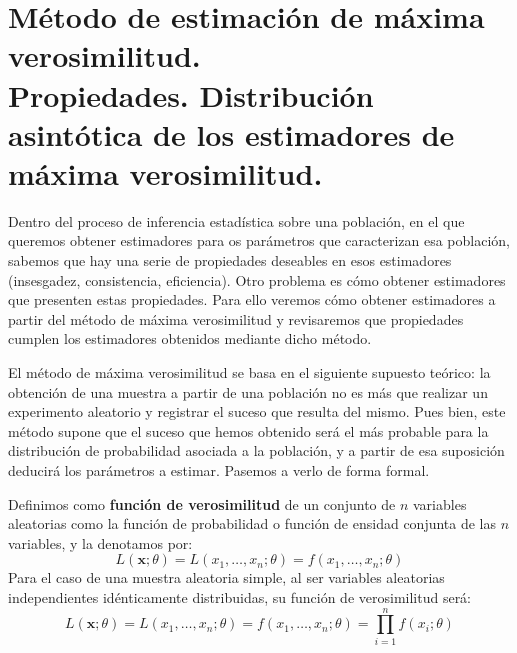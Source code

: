\chapter[M\'etodo de estimaci\'on de m\'axima verosimilitud.]{M\'etodo de estimaci\'on de m\'axima verosimilitud. \\
\normalsize Propiedades. Distribuci\'on asint\'otica de los estimadores de m\'axima verosimilitud.}

Dentro del proceso de inferencia estad\'istica sobre una poblaci\'on, en el que queremos obtener estimadores para os par\'ametros que caracterizan esa poblaci\'on, sabemos que hay una serie de propiedades deseables en esos estimadores (insesgadez, consistencia, eficiencia). Otro problema es c\'omo obtener estimadores que presenten estas propiedades. Para ello veremos c\'omo obtener estimadores a partir del m\'etodo de m\'axima verosimilitud y revisaremos que propiedades cumplen los estimadores obtenidos mediante dicho m\'etodo.


El m\'etodo de m\'axima verosimilitud se basa en el siguiente supuesto te\'orico: la obtenci\'on de una muestra a partir de una poblaci\'on no es m\'as que realizar un experimento aleatorio y registrar el suceso que resulta del mismo. Pues bien, este m\'etodo supone que el suceso que hemos obtenido ser\'a el m\'as probable para la distribuci\'on de probabilidad asociada a la poblaci\'on, y a partir de esa suposici\'on deducir\'a los par\'ametros a estimar. Pasemos a verlo de forma formal.


\begin{definicion}
Definimos como \textbf{funci\'on de verosimilitud} de un conjunto de $n$ variables aleatorias como la funci\'on de probabilidad o funci\'on de ensidad conjunta de las $n$ variables, y la denotamos por:
\begin{equation*}
L(\boldsymbol{x};\theta)=L(x_1,\ldots,x_n;\theta)=f(x_1,\ldots,x_n;\theta)
\end{equation*}
Para el caso de una muestra aleatoria simple, al ser variables aleatorias independientes id\'enticamente distribuidas, su funci\'on de verosimilitud ser\'a:
\begin{equation*}
L(\boldsymbol{x};\theta)=L(x_1,\ldots,x_n;\theta)=f(x_1,\ldots,x_n;\theta)=\prod_{i=1}^nf(x_i;\theta)
\end{equation*}
\end{definicion}

